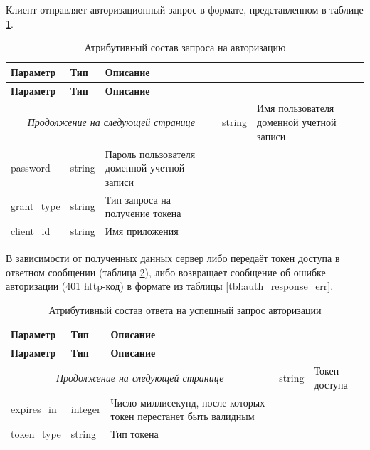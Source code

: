 Клиент отправляет авторизационный запрос в формате, представленном в таблице \ref{tbl:auth_request}.

\begin{longtable}{|p{4cm}|p{2cm}|p{9.5cm}|}
	\caption{Атрибутивный состав запроса на авторизацию}\label{tbl:auth_request}\\
	\hline
	
	\textbf{Параметр} & \textbf{Тип} & \textbf{Описание}\\ 
	\hline
	\endfirsthead
	
	\hline
	\textbf{Параметр} & \textbf{Тип} & \textbf{Описание}\\ 
	\hline
	\endhead
	
	\hline
	\multicolumn{3}{c}{\textit{Продолжение на следующей странице}}
	\endfoot
	\hline
	\endlastfoot
	
	username &
	string & 
	Имя пользователя доменной учетной записи \\
	
	\hline
	password & 
	string & 
	Пароль пользователя доменной учетной записи \\
	
	\hline
	grant\_type & 
	string & 
	Тип запроса на получение токена \\
	
	\hline
	client\_id & 
	string & 
	Имя приложения \\
\end{longtable} 

В зависимости от полученных данных сервер либо передаёт токен доступа в ответном сообщении (таблица \ref{tbl:auth_response_ok}), либо возвращает сообщение об ошибке авторизации (401 http-код) в формате из таблицы \ref{tbl:auth_response_err}.

\begin{longtable}{|p{4cm}|p{2cm}|p{9.5cm}|}
	\caption{Атрибутивный состав ответа на успешный запрос авторизации}\label{tbl:auth_response_ok}\\
	\hline
	
	\textbf{Параметр} & \textbf{Тип} & \textbf{Описание}\\ 
	\hline
	\endfirsthead
	
	\hline
	\textbf{Параметр} & \textbf{Тип} & \textbf{Описание}\\ 
	\hline
	\endhead
	
	\hline
	\multicolumn{3}{c}{\textit{Продолжение на следующей странице}}
	\endfoot
	\hline
	\endlastfoot
	
	access\_token &
	string & 
	Токен доступа \\
	
	\hline
	expires\_in & 
	integer & 
	Число миллисекунд, после которых токен перестанет быть валидным \\
	
	\hline
	token\_type & 
	string & 
	Тип токена \\
\end{longtable}

